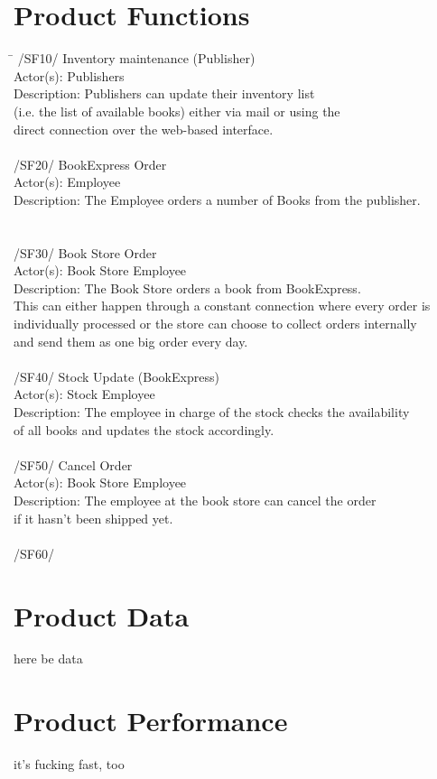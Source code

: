 \documentclass[a4paper]{article}
\begin{document}
\section{Product Functions}
\begin{tabbing}
\hspace{3cm}\=\kill
  /SF10/ \> Inventory maintenance (Publisher)\\ 
  Actor(s): \> Publishers\\ 
  Description: \> Publishers can update their inventory list\\ \> (i.e. the list of available books) either via   	mail or using the \\ \> direct connection over the web-based interface.\\
  \\
  /SF20/ \> BookExpress Order \\
  Actor(s): \> Employee \\
  Description: \> The Employee orders a number of Books from the publisher.\\
  \\
  \\
 /SF30/ \> Book Store Order \\
 Actor(s): \> Book Store Employee \\
 Description: \> The Book Store orders a book from BookExpress. \\
 \> This can either happen through a constant connection where every order is \\
 \> individually processed or the store can choose to collect orders internally \\
 \> and send them as one big order every day. \\
 \\
 /SF40/ \> Stock Update (BookExpress) \\
 Actor(s): \> Stock Employee \\
 Description: \> The employee in charge of the stock checks the availability \\
 \> of all books and updates the stock accordingly. \\
 \\
 /SF50/ \> Cancel Order \\
 Actor(s): \> Book Store Employee \\
 Description: \> The employee at the book store can cancel the order \\
 \> if it hasn't been shipped yet. \\
 \\
 /SF60/ \ 
 
\end{tabbing} 
\section{Product Data}
here be data
\\
\section{Product Performance}
it's fucking fast, too
\end{document}
